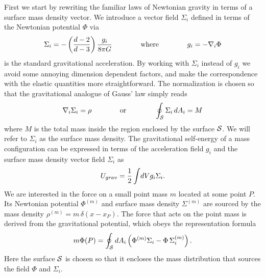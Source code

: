 \documentclass[a4paper,12pt]{article}
\newcommand{\be}{\begin{equation}}
\newcommand{\ee}{\end{equation}}
\begin{document}
 First we start by rewriting the familiar laws of Newtonian gravity in terms of a surface mass density vector.  
We introduce a vector field $\Sigma_i$ defined in terms of the Newtonian potential $\Phi$ via
\be
\label{Sigmadef}
\Sigma_i =  -\left( {d-2\over d-3}\right) {g_i \over  8\pi G}  \qquad\qquad
\mbox{where}\qquad\qquad
g_i =-\nabla_i\Phi
\ee 
is the standard gravitational acceleration. By working with $\Sigma_i$ instead of $g_i$ we avoid some annoying dimension dependent factors, and make  the correspondence with the elastic quantities more straightforward. The normalization is chosen so that the gravitational analogue of Gauss' law  
simply reads
\be 
\nabla_i \Sigma_i = \rho  \qquad\qquad\mbox{or}\qquad\qquad \oint_{\cal S}  \Sigma_i \, dA_i = M 
\ee
where $M$ is the total mass inside the region enclosed by the surface $\cal S$.  
We will refer to $\Sigma_i$ as the surface mass density. The gravitational self-energy of a mass configuration can be expressed in terms of the acceleration field $g_i$ and the surface mass density vector field $\Sigma_i$ as
\begin{equation}
U_{grav} ={1\over 2} \int \!dV g_i \Sigma_i	 .
\end{equation}
We are interested in the force on a small point mass $m$ located at some point $P$. Its Newtonian potential $\Phi^{(m)}$ and surface mass density $\Sigma^{(m)}$ are sourced by the mass density  $\rho^{(m)}=m\,\delta(x\!-\!x_P)$. The force that acts on the point mass is derived from the gravitational potential, which obeys the representation formula
\begin{equation}
m \Phi(P) = \oint_{\cal S} dA_i \left(  \Phi^{(m)} \Sigma_i  -  \Phi \,  \Sigma_i^{(m)} \right) .
\end{equation}
Here the surface $\cal S$ is chosen so that it encloses  the mass distribution that sources the field $\Phi$ and $\Sigma_i$. 


\end{document}
